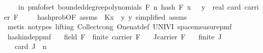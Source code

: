 \begin{isabellebody}
\ \ \ {\isachardoublequoteopen}{\isasymP}{\isacharparenleft}{\kern0pt}{\isasymomega}\ in\ pmf{\isacharunderscore}{\kern0pt}of{\isacharunderscore}{\kern0pt}set\ {\isacharparenleft}{\kern0pt}bounded{\isacharunderscore}{\kern0pt}degree{\isacharunderscore}{\kern0pt}polynomials\ F\ n{\isacharparenright}{\kern0pt}{\isachardot}{\kern0pt}\ hash\ F\ x\ {\isasymomega}\ {\isacharequal}{\kern0pt}\ y{\isacharparenright}{\kern0pt}\ {\isacharequal}{\kern0pt}\ {}{\isacharslash}{\kern0pt}{\isacharparenleft}{\kern0pt}real\ {\isacharparenleft}{\kern0pt}card\ {\isacharparenleft}{\kern0pt}carrier\ F{\isacharparenright}{\kern0pt}{\isacharparenright}{\kern0pt}{\isacharparenright}{\kern0pt}{\isachardoublequoteclose}\ \isanewline
%
\isadelimproof
\ \ %
\endisadelimproof
%
\isatagproof
{}\isamarkupfalse%
\ hash{\isacharunderscore}{\kern0pt}prob{\isacharbrackleft}{\kern0pt}OF\ assms{\isacharparenleft}{\kern0pt}{}{\isacharparenright}{\kern0pt}{\isacharcomma}{\kern0pt}\ \ K{\isacharequal}{\kern0pt}{\isachardoublequoteopen}{\isacharbraceleft}{\kern0pt}x{\isacharbraceright}{\kern0pt}{\isachardoublequoteclose}\ \ y{\isacharequal}{\kern0pt}{\isachardoublequoteopen}{\isasymlambda}{\isacharunderscore}{\kern0pt}{\isachardot}{\kern0pt}\ y{\isachardoublequoteclose}{\isacharcomma}{\kern0pt}\ simplified{\isacharbrackright}{\kern0pt}\ assms\ \isanewline
\ \ \isamarkupfalse%
\ {\isacharparenleft}{\kern0pt}metis\ {\isacharparenleft}{\kern0pt}no{\isacharunderscore}{\kern0pt}types{\isacharcomma}{\kern0pt}\ lifting{\isacharparenright}{\kern0pt}\ Collect{\isacharunderscore}{\kern0pt}cong\ One{\isacharunderscore}{\kern0pt}nat{\isacharunderscore}{\kern0pt}def\ UNIV{\isacharunderscore}{\kern0pt}I\ space{\isacharunderscore}{\kern0pt}measure{\isacharunderscore}{\kern0pt}pmf{\isacharparenright}{\kern0pt}%
\endisatagproof
{\isafoldproof}%
%
\isadelimproof
\isanewline
%
\endisadelimproof
\isanewline
{}\isamarkupfalse%
\ hash{\isacharunderscore}{\kern0pt}indep{\isacharunderscore}{\kern0pt}pmf{\isacharcolon}{\kern0pt}\isanewline
\ \ \ {\isachardoublequoteopen}field\ F\ {\isasymand}\ finite\ {\isacharparenleft}{\kern0pt}carrier\ F{\isacharparenright}{\kern0pt}{\isachardoublequoteclose}\isanewline
\ \ \ {\isachardoublequoteopen}J{\isasymsubseteq}carrier\ F{\isachardoublequoteclose}\isanewline
\ \ \ {\isachardoublequoteopen}finite\ J{\isachardoublequoteclose}\ \isanewline
\ \ \ {\isachardoublequoteopen}card\ J\ {\isasymle}\ n{\isachardoublequoteclose}\isanewline

\end{isabellebody}
